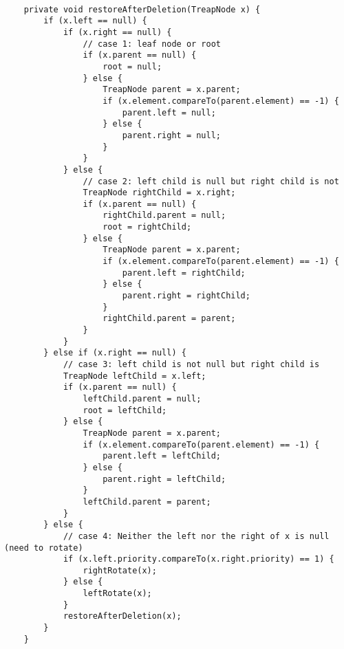\documentclass[12pt]{article}
\newenvironment{problem}[2][Problem]{\begin{trivlist}
\item[\hskip \labelsep {\bfseries #1}\hskip \labelsep {\bfseries #2.}]}{\end{trivlist}}
\begin{document}
\begin{problem}{8}

\begin{verbatim}

    private void restoreAfterDeletion(TreapNode x) {
        if (x.left == null) {
            if (x.right == null) {
                // case 1: leaf node or root
                if (x.parent == null) {
                    root = null;
                } else {
                    TreapNode parent = x.parent;
                    if (x.element.compareTo(parent.element) == -1) {
                        parent.left = null;
                    } else {
                        parent.right = null;
                    }
                }
            } else {
                // case 2: left child is null but right child is not
                TreapNode rightChild = x.right;
                if (x.parent == null) {
                    rightChild.parent = null;
                    root = rightChild;
                } else {
                    TreapNode parent = x.parent;
                    if (x.element.compareTo(parent.element) == -1) {
                        parent.left = rightChild;
                    } else {
                        parent.right = rightChild;
                    }
                    rightChild.parent = parent;
                }
            }
        } else if (x.right == null) {
            // case 3: left child is not null but right child is
            TreapNode leftChild = x.left;
            if (x.parent == null) {
                leftChild.parent = null;
                root = leftChild;
            } else {
                TreapNode parent = x.parent;
                if (x.element.compareTo(parent.element) == -1) {
                    parent.left = leftChild;
                } else {
                    parent.right = leftChild;
                }
                leftChild.parent = parent;
            }
        } else {
            // case 4: Neither the left nor the right of x is null (need to rotate)
            if (x.left.priority.compareTo(x.right.priority) == 1) {
                rightRotate(x);
            } else {
                leftRotate(x);
            }
            restoreAfterDeletion(x);
        }
    }

\end{verbatim}


\end{problem}
\end{document}
